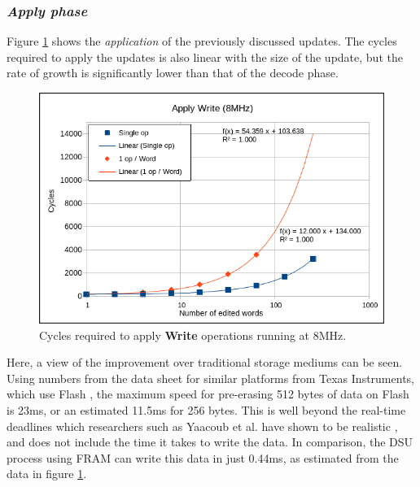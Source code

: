 \subsubsection*{\textbf{\textit{Apply phase}}}
Figure \ref{fig:wApply8} shows the \textit{application} of the previously discussed updates. The cycles required to apply the updates is also linear with the size of the update, but the rate of growth is significantly lower than that of the decode phase.
\begin{figure}[!ht]
    \begin{shaded}
        \centering
        \includegraphics[width=\figurewidth]{img/wApply8.png}
        \caption{Cycles required to apply \textbf{Write} operations running at 8MHz.}
        \label{fig:wApply8}
    \end{shaded}
\end{figure}
Here, a view of the improvement over traditional storage mediums can be seen. Using numbers from the data sheet for similar platforms from Texas Instruments, which use Flash \cite{msp430Flash}, the maximum speed for pre-erasing 512 bytes of data on Flash is 23ms, or an estimated 11.5ms for 256 bytes. This is well beyond the real-time deadlines which researchers such as Yaacoub et al. have shown to be realistic \cite{NeRTA}, and does not include the time it takes to write the data. In comparison, the DSU process using FRAM can write this data in just 0.44ms, as estimated from the data in figure \ref{fig:wApply8}.

